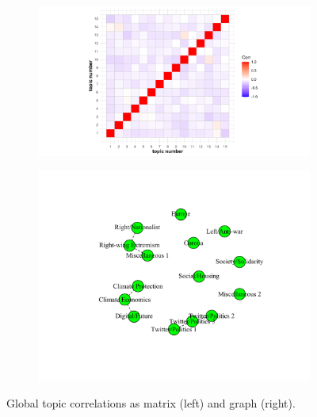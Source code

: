 \begin{figure}[h!]
  \centering
  \captionsetup{justification=centering,margin=2cm}
  \begin{subfigure}[b]{0.4\linewidth}
    \includegraphics[width=\linewidth]{../plots/4_3/topic_correlations.pdf}
  \end{subfigure}
  \begin{subfigure}[b]{0.4\linewidth}
    \includegraphics[width=\linewidth]{../plots/4_3/topic_correlations_map.pdf}
  \end{subfigure}
  \caption{Global topic correlations as matrix (left) and graph (right).}
  \label{fig:topic_correlations}
\end{figure}
